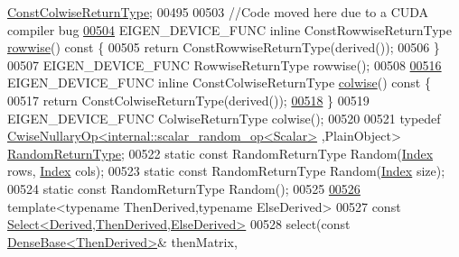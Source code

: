 \begin{DoxyCode}
      \hyperlink{group___core___module_class_eigen_1_1_vectorwise_op}{ConstColwiseReturnType};
00495 
00503     \textcolor{comment}{//Code moved here due to a CUDA compiler bug}
\hyperlink{group___core___module_af9662cd704ffc16c5b88c7b2d331576f}{00504}     EIGEN\_DEVICE\_FUNC \textcolor{keyword}{inline} ConstRowwiseReturnType \hyperlink{group___core___module_af9662cd704ffc16c5b88c7b2d331576f}{rowwise}()\textcolor{keyword}{ const }\{
00505       \textcolor{keywordflow}{return} ConstRowwiseReturnType(derived());
00506     \}
00507     EIGEN\_DEVICE\_FUNC RowwiseReturnType rowwise();
00508 
\hyperlink{group___core___module_a978724c07b70cb9b8fdef67a4de08788}{00516}     EIGEN\_DEVICE\_FUNC \textcolor{keyword}{inline} ConstColwiseReturnType \hyperlink{group___core___module_a978724c07b70cb9b8fdef67a4de08788}{colwise}()\textcolor{keyword}{ const }\{
00517       \textcolor{keywordflow}{return} ConstColwiseReturnType(derived());
\hyperlink{group___core___module_a7c9783f4e62212b5b6eb6569f282e95c}{00518}     \}
00519     EIGEN\_DEVICE\_FUNC ColwiseReturnType colwise();
00520 
00521     \textcolor{keyword}{typedef} \hyperlink{group___core___module_class_eigen_1_1_cwise_nullary_op}{CwiseNullaryOp<internal::scalar\_random\_op<Scalar>}
      ,PlainObject> \hyperlink{group___core___module_class_eigen_1_1_cwise_nullary_op}{RandomReturnType};
00522     \textcolor{keyword}{static} \textcolor{keyword}{const} RandomReturnType Random(\hyperlink{namespace_eigen_a62e77e0933482dafde8fe197d9a2cfde}{Index} rows, \hyperlink{namespace_eigen_a62e77e0933482dafde8fe197d9a2cfde}{Index} cols);
00523     \textcolor{keyword}{static} \textcolor{keyword}{const} RandomReturnType Random(\hyperlink{namespace_eigen_a62e77e0933482dafde8fe197d9a2cfde}{Index} size);
00524     \textcolor{keyword}{static} \textcolor{keyword}{const} RandomReturnType Random();
00525 
\hyperlink{group___core___module_ae4efe1d66eb46763d997910f60cc00ba}{00526}     \textcolor{keyword}{template}<\textcolor{keyword}{typename} ThenDerived,\textcolor{keyword}{typename} ElseDerived>
00527     \textcolor{keyword}{const} \hyperlink{group___core___module_class_eigen_1_1_select}{Select<Derived,ThenDerived,ElseDerived>}
00528     select(\textcolor{keyword}{const} \hyperlink{group___core___module_class_eigen_1_1_dense_base}{DenseBase<ThenDerived>}& thenMatrix,

\end{DoxyCode}
